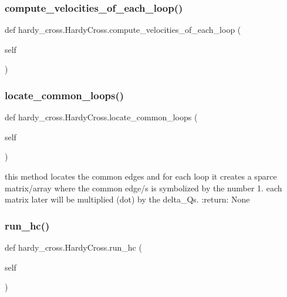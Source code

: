 \subsubsection{compute\+\_\+velocities\+\_\+of\+\_\+each\+\_\+loop()}
{\footnotesize\ttfamily def hardy\+\_\+cross.\+Hardy\+Cross.\+compute\+\_\+velocities\+\_\+of\+\_\+each\+\_\+loop (\begin{DoxyParamCaption}\item[{}]{self }\end{DoxyParamCaption})}

\mbox{\label{classhardy__cross_1_1_hardy_cross_a7ca4aa87024f6d117e0b9693bd05a058}} 
\subsubsection{locate\+\_\+common\+\_\+loops()}
{\footnotesize\ttfamily def hardy\+\_\+cross.\+Hardy\+Cross.\+locate\+\_\+common\+\_\+loops (\begin{DoxyParamCaption}\item[{}]{self }\end{DoxyParamCaption})}

\begin{DoxyVerb}this method locates the common edges and for each loop it creates a sparce matrix/array where the common edge/s
is symbolized by the number 1. each matrix later will be multiplied (dot) by the delta_Qs.
:return: None
\end{DoxyVerb}
 \mbox{\label{classhardy__cross_1_1_hardy_cross_a508fc873ca07138a7f6caec2dc6f5e83}} 
\subsubsection{run\+\_\+hc()}
{\footnotesize\ttfamily def hardy\+\_\+cross.\+Hardy\+Cross.\+run\+\_\+hc (\begin{DoxyParamCaption}\item[{}]{self }\end{DoxyParamCaption})}

\mbox{\label{classhardy__cross_1_1_hardy_cross_ac7bb55de1f73da2011b60e39ba79b6a1}} 
